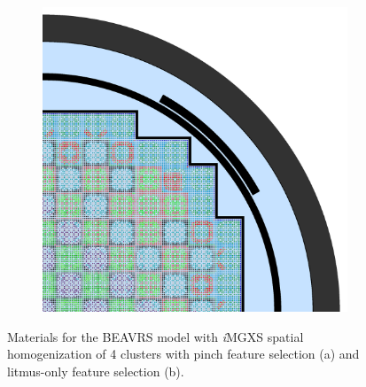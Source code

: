 \begin{figure}[h!]
\begin{subfigure}{0.67\textwidth}
  \includegraphics[width=\linewidth]{figures/unsupervised/geometries/with-features/4-clusters/combined/full-core}
  \caption{}
  \label{fig:chap10-full-core-combined-4}
\end{subfigure}
\caption[Materials for BEAVRS with \textit{i}\ac{MGXS} homogenization (4 clusters)]{Materials for the \ac{BEAVRS} model with \textit{i}\ac{MGXS} spatial homogenization of 4 clusters with pinch feature selection (a) and litmus-only feature selection (b).}
\label{fig:chap10-full-core-geometries-4}
\end{figure}

\clearpage

